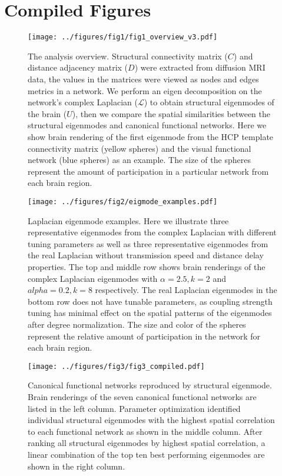 \documentclass{article}
\begin{document}
\section{Compiled Figures}

\begin{figure}[ht]
  \centering
  \texttt{[image: ../figures/fig1/fig1\_overview\_v3.pdf]}
  \caption{The analysis overview. Structural connectivity matrix ($C$) and distance adjacency matrix ($D$) were extracted from diffusion MRI data, the values in the matrices were viewed as nodes and edges metrics in a network. We perform an eigen decomposition on the network's complex Laplacian ($\mathcal{L}$) to obtain structural eigenmodes of the brain ($U$), then we compare the spatial similarities between the structural eigenmodes and canonical functional networks. Here we show brain rendering of the first eigenmode from the HCP template connectivity matrix (yellow spheres) and the visual functional network (blue spheres) as an example. The size of the spheres represent the amount of participation in a particular network from each brain region.}
  \label{fig:fig1}
\end{figure}

\begin{figure}[ht]
 \centering
 \texttt{[image: ../figures/fig2/eigmode\_examples.pdf]}
 \caption{Laplacian eigenmode examples. Here we illustrate three representative eigenmodes from the complex Laplacian with different tuning parameters as well as three representative eigenmodes from the real Laplacian without transmission speed and distance delay properties. The top and middle row shows brain renderings of the complex Laplacian eigenmodes with {$\alpha = 2.5, k = 2$} and {$alpha = 0.2, k = 8$} respectively. The real Laplacian eigenmodes in the bottom row does not have tunable parameters, as coupling strength tuning has minimal effect on the spatial patterns of the eigenmodes after degree normalization. The size and color of the spheres represent the relative amount of participation in the network for each brain region.}
 \label{fig:fig2}
\end{figure}

\begin{figure}[ht]
 \centering
 \texttt{[image: ../figures/fig3/fig3\_compiled.pdf]}
 \caption{Canonical functional networks reproduced by structural eigenmode. Brain renderings of the seven canonical functional networks are listed in the left column. Parameter optimization identified individual structural eigenmodes with the highest spatial correlation to each functional network as shown in the middle column. After ranking all structural eigenmodes by highest spatial correlation, a linear combination of the top ten best performing eigenmodes are shown in the right column.}
 \label{fig:fig3}
\end{figure}
\end{document}
